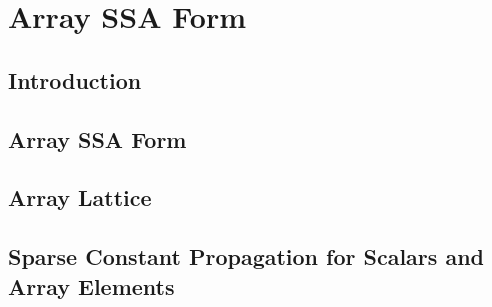 \chapter{Array SSA Form }
\graphicspath{{part2/array_ssa/Figs/}{array_ssa/Figs/}{Figs/}}

\section{Introduction}
\label{sec:intro}

\section{Array SSA Form}
\label{sec:arrayssa}

\section{Array Lattice}
\label{sec:arraylattice}

\section{Sparse Constant Propagation for Scalars and Array Elements}
\label{sec:sc}

